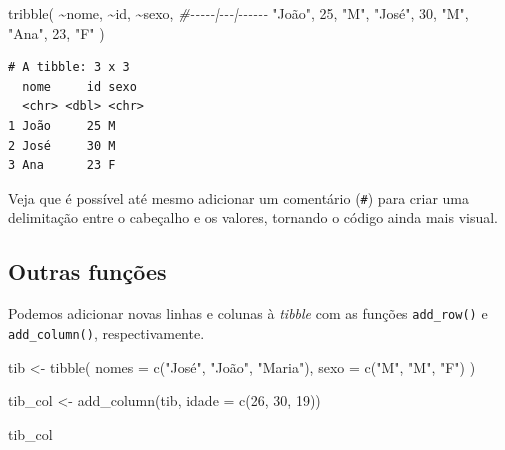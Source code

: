 \documentclass[
  brazilian,
]{book}
\newenvironment{Shaded}{\begin{snugshade}}{\end{snugshade}}
\newcommand{\AttributeTok}[1]{\textcolor[rgb]{0.77,0.63,0.00}{#1}}
\newcommand{\CommentTok}[1]{\textcolor[rgb]{0.56,0.35,0.01}{\textit{#1}}}
\newcommand{\DecValTok}[1]{\textcolor[rgb]{0.00,0.00,0.81}{#1}}
\newcommand{\FunctionTok}[1]{\textcolor[rgb]{0.00,0.00,0.00}{#1}}
\newcommand{\NormalTok}[1]{#1}
\newcommand{\OtherTok}[1]{\textcolor[rgb]{0.56,0.35,0.01}{#1}}
\newcommand{\SpecialCharTok}[1]{\textcolor[rgb]{0.00,0.00,0.00}{#1}}
\newcommand{\StringTok}[1]{\textcolor[rgb]{0.31,0.60,0.02}{#1}}
\begin{document}
\begin{Shaded}
\begin{Highlighting}[]
\FunctionTok{tribble}\NormalTok{(}
  \SpecialCharTok{\textasciitilde{}}\NormalTok{nome, }\SpecialCharTok{\textasciitilde{}}\NormalTok{id, }\SpecialCharTok{\textasciitilde{}}\NormalTok{sexo,}
  \CommentTok{\#{-}{-}{-}{-}{-}|{-}{-}{-}|{-}{-}{-}{-}{-}{-}}
  \StringTok{"João"}\NormalTok{, }\DecValTok{25}\NormalTok{, }\StringTok{"M"}\NormalTok{,}
  \StringTok{"José"}\NormalTok{, }\DecValTok{30}\NormalTok{, }\StringTok{"M"}\NormalTok{,}
  \StringTok{"Ana"}\NormalTok{, }\DecValTok{23}\NormalTok{, }\StringTok{"F"}
\NormalTok{)}
\end{Highlighting}
\end{Shaded}

\begin{verbatim}
# A tibble: 3 x 3
  nome     id sexo 
  <chr> <dbl> <chr>
1 João     25 M    
2 José     30 M    
3 Ana      23 F    
\end{verbatim}

Veja que é possível até mesmo adicionar um comentário (\texttt{\#}) para criar uma delimitação entre o cabeçalho e os valores, tornando o código ainda mais visual.

\hypertarget{outras-funuxe7uxf5es}{%
\subsection{Outras funções}\label{outras-funuxe7uxf5es}}

Podemos adicionar novas linhas e colunas à \emph{tibble} com as funções \texttt{add\_row()} e \texttt{add\_column()}, respectivamente.

\begin{Shaded}
\begin{Highlighting}[]
\NormalTok{tib }\OtherTok{\textless{}{-}} \FunctionTok{tibble}\NormalTok{(}
  \AttributeTok{nomes =} \FunctionTok{c}\NormalTok{(}\StringTok{"José"}\NormalTok{, }\StringTok{"João"}\NormalTok{, }\StringTok{"Maria"}\NormalTok{),}
  \AttributeTok{sexo =} \FunctionTok{c}\NormalTok{(}\StringTok{"M"}\NormalTok{, }\StringTok{"M"}\NormalTok{, }\StringTok{"F"}\NormalTok{)}
\NormalTok{)}

\NormalTok{tib\_col }\OtherTok{\textless{}{-}} \FunctionTok{add\_column}\NormalTok{(tib, }\AttributeTok{idade =} \FunctionTok{c}\NormalTok{(}\DecValTok{26}\NormalTok{, }\DecValTok{30}\NormalTok{, }\DecValTok{19}\NormalTok{))}

\NormalTok{tib\_col}
\end{Highlighting}
\end{Shaded}
\end{document}
